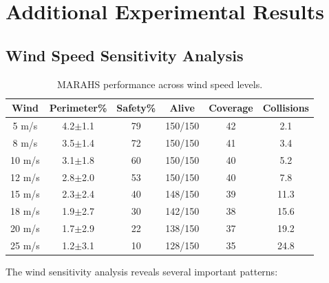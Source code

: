 \documentclass[12pt,a4paper]{article}
\begin{document}
\section{Additional Experimental Results}
\label{app:additional}

\subsection{Wind Speed Sensitivity Analysis}

\begin{table}[t]
\centering
\caption{MARAHS performance across wind speed levels.}
\label{tab:wind_sensitivity}
\begin{tabular}{cccccc}
\toprule
\textbf{Wind} & \textbf{Perimeter\%} & \textbf{Safety\%} & \textbf{Alive} & \textbf{Coverage} & \textbf{Collisions} \\
\midrule
5 m/s   & 4.2$\pm$1.1 & 79 & 150/150 & 42 & 2.1 \\
8 m/s   & 3.5$\pm$1.4 & 72 & 150/150 & 41 & 3.4 \\
10 m/s  & 3.1$\pm$1.8 & 60 & 150/150 & 40 & 5.2 \\
12 m/s  & 2.8$\pm$2.0 & 53 & 150/150 & 40 & 7.8 \\
15 m/s  & 2.3$\pm$2.4 & 40 & 148/150 & 39 & 11.3 \\
18 m/s  & 1.9$\pm$2.7 & 30 & 142/150 & 38 & 15.6 \\
20 m/s  & 1.7$\pm$2.9 & 22 & 138/150 & 37 & 19.2 \\
25 m/s  & 1.2$\pm$3.1 & 10 & 128/150 & 35 & 24.8 \\
\bottomrule
\end{tabular}
\end{table}

The wind sensitivity analysis reveals several important patterns:
\end{document}
